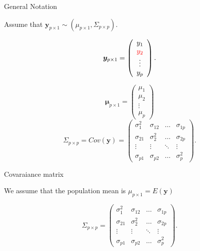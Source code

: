 \documentclass[ignorenonframetext,]{beamer}
\newcommand{\bmu}{\bm{\mu}}
\newcommand{\sig}   {\Sigma}
\begin{document}
\begin{frame}{General Notation}

Assume that
\(\bm{y}_{p \times 1} \sim (\mu_{p \times 1}, \Sigma_{p \times p}).\)

\[\bm{y}_{p \times 1}= \left( \begin{array}{c}
y_{1}\\
\textcolor{red}{y_{2}}\\
\vdots\\
y_{p}
\end{array} \right).\]

\[\bmu_{p \times 1}= \left( \begin{array}{c}
\mu_1\\
\mu_2\\
\vdots\\
\mu_p
\end{array} \right)
\] \[
\sig_{p \times p} = Cov(\bm{y}) =
\left( \begin{array}{cccc}
\sigma_1^2 & \sigma_{12} & \ldots&  \sigma_{1p}\\
\sigma_{21} & \sigma_2^2 & \ldots& \sigma_{2p}\\
\vdots & \vdots & \ddots & \vdots \\
\sigma_{p1} & \sigma_{p2} &\ldots& \sigma_p^2
\end{array} \right).
\]

\end{frame}

\begin{frame}{Covaraiance matrix}

We assume that the population mean is \({\mu}_{p \times 1} = E(\bm{y})\)

\[\sig_{p \times p} = 
\left( \begin{array}{cccc}
\sigma_1^2 & \sigma_{12} & \ldots&  \sigma_{1p}\\
\sigma_{21} & \sigma_2^2 & \ldots& \sigma_{2p}\\
\vdots & \vdots & \ddots & \vdots \\
\sigma_{p1} & \sigma_{p2} &\ldots& \sigma_p^2
\end{array} \right).
\]

\end{frame}

\end{document}

